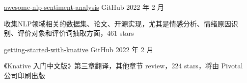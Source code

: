 \begin{cventries}
  \cventry
    {} %
    {\href{haiker2011/awesome-nlp-sentiment-analysis}{awesome-nlp-sentiment-analysis}} %
    {GitHub} %
    {2022 年 2 月} %
    {
      \begin{cvitems} %
        \item 收集NLP领域相关的数据集、论文、开源实现，尤其是情感分析、情绪原因识别、评价对象和评价词抽取方面，461 stars
      \end{cvitems}
    }

  \cventry
    {} %
    {\href{https://github.com/servicemesher/getting-started-with-knative}{getting-started-with-knative}} %
    {GitHub} %
    {2022 年 2 月} %
    {
      \begin{cvitems} %
        \item 《Knative 入门中文版》第三章翻译，其他章节 review，224 stars，将由 Pivotal 公司印刷出版
      \end{cvitems}
    }




\end{cventries}